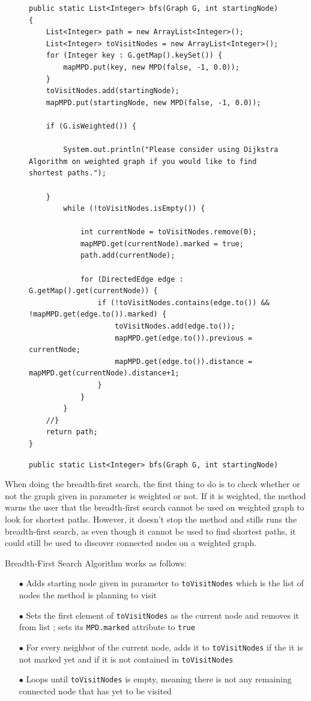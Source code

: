 \documentclass{article}
\begin{document}
\begin{figure}[H]
\begin{verbatim}
public static List<Integer> bfs(Graph G, int startingNode) {
	List<Integer> path = new ArrayList<Integer>();
	List<Integer> toVisitNodes = new ArrayList<Integer>();
	for (Integer key : G.getMap().keySet()) {
		mapMPD.put(key, new MPD(false, -1, 0.0));
	}
	toVisitNodes.add(startingNode);
	mapMPD.put(startingNode, new MPD(false, -1, 0.0));
	
	if (G.isWeighted()) {
		
		System.out.println("Please consider using Dijkstra Algorithm on weighted graph if you would like to find shortest paths.");
		
	}	
		while (!toVisitNodes.isEmpty()) {

			int currentNode = toVisitNodes.remove(0);
			mapMPD.get(currentNode).marked = true;
			path.add(currentNode);
			
			for (DirectedEdge edge : G.getMap().get(currentNode)) {
				if (!toVisitNodes.contains(edge.to()) && !mapMPD.get(edge.to()).marked) {
					toVisitNodes.add(edge.to());
					mapMPD.get(edge.to()).previous = currentNode;
					mapMPD.get(edge.to()).distance = mapMPD.get(currentNode).distance+1;					
				}
			}
		}
	//}
	return path;
}	
\end{verbatim}
\vspace*{-6mm}\caption{\texttt{public static List<Integer> bfs(Graph G, int startingNode)}}
\end{figure}

When doing the breadth-first search, the first thing to do is to check whether or not the graph given in parameter is weighted or not.  If it is weighted, the method warns the user that the breadth-first search cannot be used on weighted graph to look for shortest paths. However, it doesn't stop the method and stills runs the breadth-first search, as even though it cannot be used to find shortest paths, it could still be used to discover connected nodes on a weighted graph.

Breadth-First Search Algorithm works as follows:
\begin{itemize}
\item[$\bullet$] Adds starting node given in parameter  to \texttt{toVisitNodes} which is the list of nodes the method is planning to visit
\item[$\bullet$] Sets the first element of \texttt{toVisitNodes} as the current node and removes it from list ; sets its \texttt{MPD.marked} attribute to \texttt{true}
\item[$\bullet$] For every neighbor of the current node, adds it to \texttt{toVisitNodes} if the it is not marked yet and if it is not contained in \texttt{toVisitNodes}
\item[$\bullet$] Loops until \texttt{toVisitNodes} is empty, meaning there is not any remaining connected node that has yet to be visited
\end{itemize}
\end{document}
